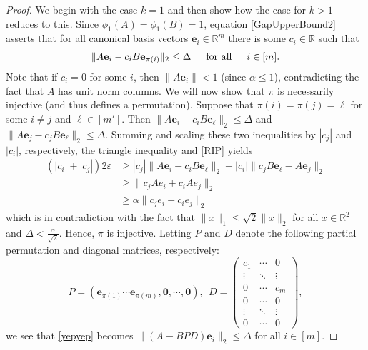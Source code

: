 \documentclass[journal, onecolumn]{IEEEtran}
\begin{document}
\begin{proof}
We begin with the case $k=1$ and then show how the case for $k>1$ reduces to this. Since $\phi_1(A) = \phi_1(B) = 1$, equation \eqref{GapUpperBound2} asserts that for all canonical basis vectors $\mathbf{e}_i \in \mathbb{R}^m$ there is some $c_i \in \mathbb{R}$ such that 
\begin{align}\label{yepyep}
\|A\mathbf{e}_i - c_iB\mathbf{e}_{\pi(i)}\|_2 \leq \Delta \indent \text{for all} \indent i \in [m].
\end{align}
Note that if $c_i = 0$ for some $i$, then $\|A\mathbf{e}_i\| < 1$ (since $\alpha \leq 1$), contradicting the fact that $A$ has unit norm columns. We will now show that $\pi$ is necessarily injective (and thus defines a permutation). Suppose that $\pi(i) = \pi(j) = \ell$ for some $i \neq j$ and $\ell \in [m']$. Then $\|A\mathbf{e}_i - c_iB\mathbf{e}_{\ell}\|_2  \leq \Delta$ and $\|A\mathbf{e}_j - c_jB\mathbf{e}_{\ell}\|_2 \leq \Delta$. Summing and scaling these two inequalities by $|c_j|$ and $|c_i|$, respectively, the triangle inequality and \eqref{RIP} yields
\begin{align*}
(|c_i| + |c_j|) 2\varepsilon
&\geq |c_j|\|A\mathbf{e}_i - c_iB\mathbf{e}_{\ell}\|_2 + |c_i|\|c_jB\mathbf{e}_{\ell} - A\mathbf{e}_j\|_2 \\
&\geq \|c_jAe_i + c_iAe_j\|_2 \\
&\geq \alpha\|c_je_i + c_ie_j\|_2
\end{align*}
%
which is in contradiction with the fact that $\|x\|_1 \leq \sqrt{2}\|x\|_2$ for all $x \in \mathbb{R}^2$ and $\Delta < \frac{\alpha}{\sqrt{2}}$. Hence, $\pi$ is injective. Letting $P$ and $D$ denote the following partial permutation and diagonal matrices, respectively:
\begin{equation}\label{PandD}
P = \left( \mathbf{e}_{\pi(1)} \cdots \mathbf{e}_{\pi(m)}, \mathbf{0}, \cdots, \mathbf{0} \right), \ \ D = \left(\begin{array}{ccc}c_1 & \cdots & 0 \\\vdots & \ddots & \vdots \\0 & \cdots & c_m \\ 0 & \cdots & 0 \\ \vdots & \ddots & \vdots \\ 0 & \cdots & 0
\end{array}\right),
\end{equation}
%
we see that \eqref{yepyep} becomes $\|(A - BPD)\mathbf{e}_i\|_2 \leq \Delta$ for all $i \in [m]$.


\end{proof}
\end{document}
